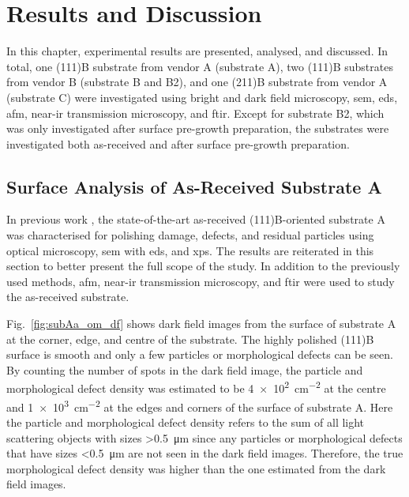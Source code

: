 \chapter{Results and Discussion}\label{ch:results-and-discussion}
In this chapter, experimental results are presented, analysed, and discussed. In total, one (111)B substrate from vendor A (substrate A), two (111)B substrates from vendor B (substrate B and B2), and one (211)B substrate from vendor A (substrate C) were investigated using bright and dark field microscopy, \ac{sem}, \ac{eds}, \ac{afm}, near-\ac{ir} transmission microscopy, and \ac{ftir}. Except for substrate B2, which was only investigated after surface pre-growth preparation, the substrates were investigated both as-received and after surface pre-growth preparation.%

\section{Surface Analysis of As-Received Substrate A}\label{sec:subAa}
In previous work \citep{lauten2017characterisation}, the state-of-the-art as-received (111)B-oriented substrate A was characterised for polishing damage, defects, and residual particles using optical microscopy, \ac{sem} with \ac{eds}, and \ac{xps}. The results are reiterated in this section to better present the full scope of the study. In addition to the previously used methods, \ac{afm}, near-\ac{ir} transmission microscopy, and \ac{ftir} were used to study the as-received substrate.

Fig.~\ref{fig:subAa_om_df} shows dark field images from the surface of substrate A at the corner, edge, and centre of the substrate. The highly polished (111)B surface is smooth and only a few particles or morphological defects can be seen. By counting the number of spots in the dark field image, the particle and morphological defect density was estimated to be \SI{4e2}{\centi\metre^{-2}} at the centre and \SI{1e3}{\centi\metre^{-2}} at the edges and corners of the surface of substrate A. Here the particle and morphological defect density refers to the sum of all light scattering objects with sizes \SI{>0.5}{\micro\metre} since any particles or morphological defects that have sizes \SI{<0.5}{\micro\metre} are not seen in the dark field images. Therefore, the true morphological defect density was higher than the one estimated from the dark field images.

